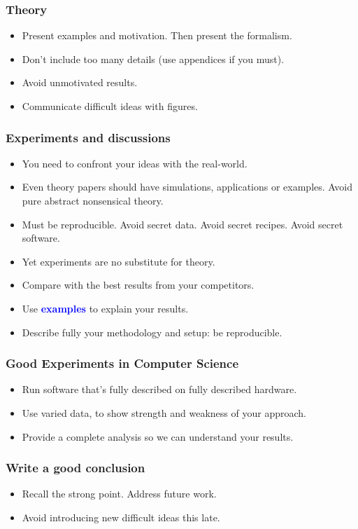 \documentclass[handout]{beamer}
\newcommand{\important}[1]{\textcolor{blue}{\textbf{#1}}}
\begin{document}
\frame
{
  \frametitle{Theory}

\begin{itemize}
  \item<1-> Present examples and motivation. Then present the formalism.
  \item<2-> Don't include too many details (use appendices if you must).
  \item<3-> Avoid unmotivated results.
  \item<4-> Communicate difficult ideas with figures.
\end{itemize}
}


\frame
{
  \frametitle{Experiments and discussions}

\begin{itemize}
 \item<1->You need to confront your ideas with the real-world.
  \item<2-> Even theory papers should have simulations, applications or examples. Avoid pure abstract nonsensical theory.
  \item<3-> Must be reproducible. Avoid secret data. Avoid secret
recipes. Avoid secret software.
  \item<4-> Yet experiments are no substitute for theory.
  \item<5->Compare with the best results from your competitors.
  \item<6-> Use \important{examples} to explain your results.
  \item<7-> Describe fully your methodology and setup: be reproducible.
\end{itemize}
}

\frame
{
  \frametitle{Good Experiments in Computer Science}

\begin{itemize}
 \item<1->Run software that's fully described on fully described hardware.
  \item<2->Use varied data, to show strength and weakness of your approach.
  \item<3->Provide a complete analysis so we can understand your results.
\end{itemize}
}

\frame
{
  \frametitle{Write a good conclusion}

\begin{itemize}
  \item<1-> Recall the strong point. Address future work.
  \item<2-> Avoid introducing new  difficult ideas this late.
\end{itemize}
}
\end{document}
